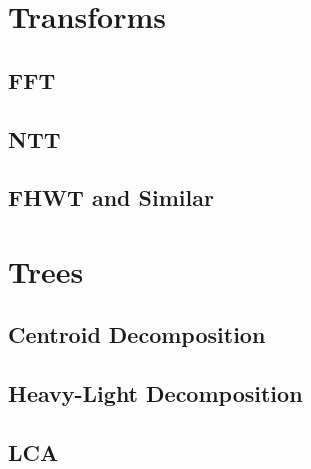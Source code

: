 \section{Transforms}
\subsection{FFT}
\raggedbottom
\hrulefill
\subsection{NTT}
\raggedbottom
\hrulefill
\subsection{FHWT and Similar}
\raggedbottom
\hrulefill

\section{Trees}
\subsection{Centroid Decomposition}
\raggedbottom
\hrulefill
\subsection{Heavy-Light Decomposition}
\raggedbottom
\hrulefill
\subsection{LCA}
\raggedbottom
\hrulefill

